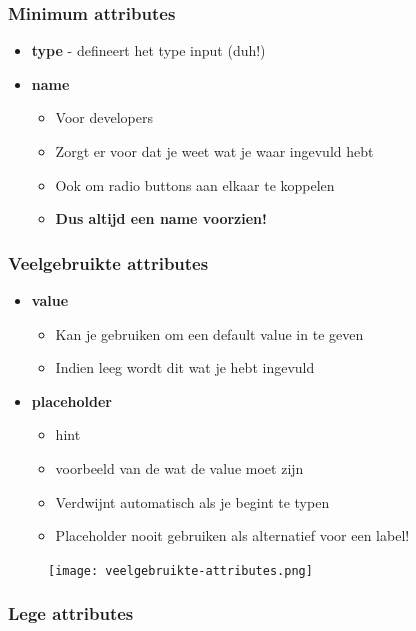 \documentclass{article}
\newcommand{\bold}[1]{\textbf{#1}}
\begin{document}
\subsubsection{Minimum attributes}
\begin{itemize}
    \item \bold{type} - defineert het type input (duh!)
    \item \bold{name}
    \begin{itemize}
        \item Voor developers
        \item Zorgt er voor dat je weet wat je waar ingevuld hebt
        \item Ook om radio buttons aan elkaar te koppelen
        \item \bold{Dus altijd een name voorzien!}
    \end{itemize}
\end{itemize}

\subsubsection{Veelgebruikte attributes}

\begin{itemize}
    \item \bold{value}
    \begin{itemize}
        \item Kan je gebruiken om een default value in te geven
        \item Indien leeg wordt dit wat je hebt ingevuld
    \end{itemize}
    \item \bold{placeholder}
    \begin{itemize}
        \item hint
        \item voorbeeld van de wat de value moet zijn
        \item Verdwijnt automatisch als je begint te typen
        \item Placeholder nooit gebruiken als alternatief voor een label!
    \end{itemize}
\end{itemize}

\begin{figure}[H]
    \centering
    \texttt{[image: veelgebruikte-attributes.png]}
    \caption{}
\end{figure}

\subsubsection{Lege attributes}
\end{document}
